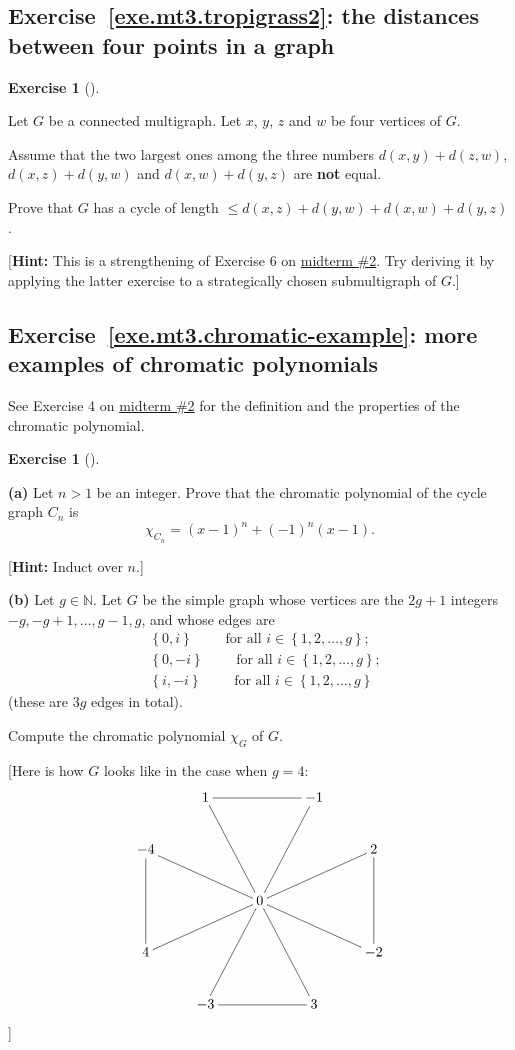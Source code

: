 \documentclass[numbers=enddot,12pt,final,onecolumn,notitlepage]{scrartcl}%
\makeatletter
\newcounter{exer}
\theoremstyle{definition}
\newtheorem{exmp}[exer]{Exercise}
\newenvironment{exercise}[1][]
{\begin{exmp}[#1]\begin{leftbar}}
{\end{leftbar}\end{exmp}}
\newcommand{\NN}{\mathbb{N}}
\newcommand{\set}[1]{\left\{ #1 \right\}}
\newcommand{\tup}[1]{\left( #1 \right)}
\newcommand{\are}{\ar@{-}}
\makeatother
\begin{document}
\subsection{Exercise~\ref{exe.mt3.tropigrass2}:
the distances between four points in a graph}

\begin{exercise} \label{exe.mt3.tropigrass2}
Let $G$ be a connected multigraph.
Let $x$, $y$, $z$ and $w$ be four vertices of $G$.

Assume that the two largest ones among the three numbers
$d \tup{x, y} + d \tup{z, w}$,
$d \tup{x, z} + d \tup{y, w}$ and
$d \tup{x, w} + d \tup{y, z}$
are \textbf{not} equal.

Prove that $G$ has a cycle of length
$\leq d \tup{x, z} + d \tup{y, w} + d \tup{x, w} + d \tup{y, z}$.

[\textbf{Hint:} This is a strengthening of Exercise 6 on
\href{http://www-users.math.umn.edu/~dgrinber/5707s17/mt2s.pdf}{midterm \#2}.
Try deriving it by applying the latter exercise to a strategically
chosen submultigraph of $G$.]
\end{exercise}

\subsection{Exercise~\ref{exe.mt3.chromatic-example}:
more examples of chromatic polynomials}

See Exercise 4 on
\href{http://www-users.math.umn.edu/~dgrinber/5707s17/mt2s.pdf}{midterm \#2}
for the definition and the properties of the chromatic polynomial.

\Needspace{8cm}
\begin{exercise} \label{exe.mt3.chromatic-example}
\textbf{(a)} Let $n > 1$ be an integer.
Prove that the chromatic polynomial of the cycle graph
$C_n$ is
\[
\chi_{C_n} = \tup{x-1}^n + \tup{-1}^n \tup{x-1} .
\]

[\textbf{Hint:} Induct over $n$.]

\textbf{(b)} Let $g \in \NN$.
Let $G$ be the simple graph whose vertices are the $2g+1$
integers $-g, -g+1, \ldots, g-1, g$, and whose edges are
\begin{align*}
& \set{0, i} \qquad \text{ for all } i \in \set{1, 2, \ldots, g}; \\
& \set{0, -i} \qquad \text{ for all } i \in \set{1, 2, \ldots, g}; \\
& \set{i, -i} \qquad \text{ for all } i \in \set{1, 2, \ldots, g}
\end{align*}
(these are $3g$ edges in total).

Compute the chromatic polynomial $\chi_G$ of $G$.

[Here is how $G$ looks like in the case when $g = 4$:
\[
\xymatrix{
& 1 \are[ddr] \are[rr] & & -1 \are[ddl] \\
-4 \are[dd] \are[drr] & & & & 2 \are[dd] \\
& & 0 \are[urr] \are[drr] \are[dll] \are[ddl] \are[ddr] \\
4 & & & & -2 \\
& -3 \are[rr] & & 3
}
\]
]
\end{exercise}
\end{document}
